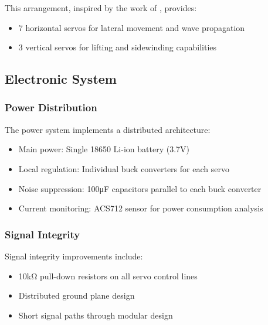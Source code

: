 \documentclass[12pt,a4paper]{report}
\begin{document}
This arrangement, inspired by the work of \cite{Seeja2022}, provides:
\begin{itemize}
    \item 7 horizontal servos for lateral movement and wave propagation
    \item 3 vertical servos for lifting and sidewinding capabilities
\end{itemize}

\subsection{Electronic System}
\subsubsection{Power Distribution}
The power system implements a distributed architecture:
\begin{itemize}
    \item Main power: Single 18650 Li-ion battery (3.7V)
    \item Local regulation: Individual buck converters for each servo
    \item Noise suppression: 100μF capacitors parallel to each buck converter
    \item Current monitoring: ACS712 sensor for power consumption analysis
\end{itemize}

\subsubsection{Signal Integrity}
Signal integrity improvements include:
\begin{itemize}
    \item 10kΩ pull-down resistors on all servo control lines
    \item Distributed ground plane design
    \item Short signal paths through modular design
\end{itemize}
\end{document}
